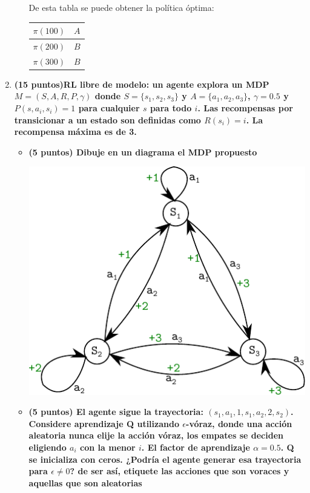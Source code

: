 \documentclass[a4paper,10pt]{article}
\begin{document}
\begin{enumerate}
\begin{itemize}
	De esta tabla se puede obtener la política óptima:
	
	\begin{tabular}{|c|c|}
	\hline
	$\pi (100)$ & $A$ \\ \hline
	$\pi (200)$ & $B$ \\ \hline
	$\pi (300)$ & $B$ \\ \hline
	\end{tabular}
	
    \end{itemize}

    \item \textbf{(15 puntos)\textbf{RL libre de modelo:} un agente explora un MDP $M=(S,A,R,P,\gamma)$ donde $S=\{s_1,s_2,s_3\}$ y $A=\{a_1,a_2,a_3\}$, $\gamma=0.5$ y $P(s,a_i,s_i)=1$ para cualquier $s$ para todo $i$. Las recompensas por transicionar a un estado son definidas como $R(s_i)=i$. La recompensa máxima es de 3.} 
    \begin{itemize}
	\item \textbf{(5 puntos) Dibuje en un diagrama el MDP propuesto}
	
	\includegraphics[scale=1]{mdp_qlearning}
	
	\item \textbf{(5 puntos) El agente sigue la trayectoria: $(s_1, a_1, 1, s_1 ,a_2, 2, s_2)$. Considere aprendizaje Q utilizando $\epsilon$-vóraz, donde una acción aleatoria nunca elije la acción vóraz, los empates se deciden eligiendo $a_i$ con la menor $i$. El factor de aprendizaje $\alpha=0.5$. Q se inicializa con ceros. ¿Podría el agente generar esa trayectoria para $\epsilon\neq 0$? de ser así, etiquete las acciones que son voraces y aquellas que son aleatorias}
	

\end{itemize}
\end{enumerate}
\end{document}
